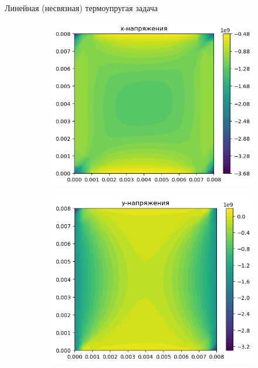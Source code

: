 \documentclass{beamer}
\begin{document}
\begin{frame}{Линейная (несвязная) термоупругая задача}
\begin{figure}[H]
\begin{subfigure}[H]{0.4\textwidth}
		\includegraphics[width=\textwidth]{stress_x}
	\end{subfigure}
	\qquad\qquad
	\begin{subfigure}[H]{0.4\textwidth}
		\includegraphics[width=\textwidth]{xtress_y}
	\end{subfigure}	
\end{figure}	
\end{frame}
\end{document}
